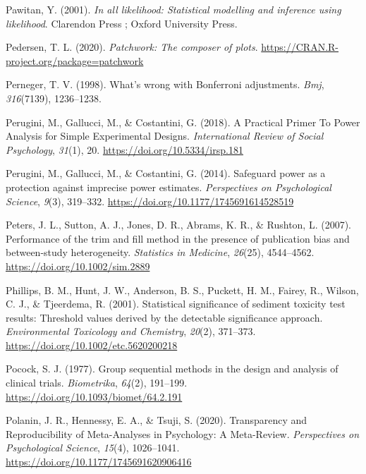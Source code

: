 \documentclass[
  oneside]{krantz}
\newlength{\cslhangindent}
\newlength{\cslentryspacingunit} %
\newenvironment{CSLReferences}[2] %
 {%
  \setlength{\parindent}{0pt}
  \ifodd #1
  \let\oldpar\par
  \def\par{\hangindent=\cslhangindent\oldpar}
  \fi
  \setlength{\parskip}{#2\cslentryspacingunit}
 }%
 {}
\begin{document}
\begin{CSLReferences}{1}{0}
\leavevmode{}%
Pawitan, Y. (2001). \emph{In all likelihood: Statistical modelling and
inference using likelihood}. {Clarendon Press ; Oxford University
Press}.

\leavevmode{}%
Pedersen, T. L. (2020). \emph{Patchwork: The composer of plots}.
\url{https://CRAN.R-project.org/package=patchwork}

\leavevmode{}%
Perneger, T. V. (1998). What's wrong with {Bonferroni} adjustments.
\emph{Bmj}, \emph{316}(7139), 1236--1238.

\leavevmode{}%
Perugini, M., Gallucci, M., \& Costantini, G. (2018). A {Practical
Primer To Power Analysis} for {Simple Experimental Designs}.
\emph{International Review of Social Psychology}, \emph{31}(1), 20.
\url{https://doi.org/10.5334/irsp.181}

\leavevmode{}%
Perugini, M., Gallucci, M., \& Costantini, G. (2014). Safeguard power as
a protection against imprecise power estimates. \emph{Perspectives on
Psychological Science}, \emph{9}(3), 319--332.
\url{https://doi.org/10.1177/1745691614528519}

\leavevmode{}%
Peters, J. L., Sutton, A. J., Jones, D. R., Abrams, K. R., \& Rushton,
L. (2007). Performance of the trim and fill method in the presence of
publication bias and between-study heterogeneity. \emph{Statistics in
Medicine}, \emph{26}(25), 4544--4562.
\url{https://doi.org/10.1002/sim.2889}

\leavevmode{}%
Phillips, B. M., Hunt, J. W., Anderson, B. S., Puckett, H. M., Fairey,
R., Wilson, C. J., \& Tjeerdema, R. (2001). Statistical significance of
sediment toxicity test results: {Threshold} values derived by the
detectable significance approach. \emph{Environmental Toxicology and
Chemistry}, \emph{20}(2), 371--373.
\url{https://doi.org/10.1002/etc.5620200218}

\leavevmode{}%
Pocock, S. J. (1977). Group sequential methods in the design and
analysis of clinical trials. \emph{Biometrika}, \emph{64}(2), 191--199.
\url{https://doi.org/10.1093/biomet/64.2.191}

\leavevmode{}%
Polanin, J. R., Hennessy, E. A., \& Tsuji, S. (2020). Transparency and
{Reproducibility} of {Meta-Analyses} in {Psychology}: {A Meta-Review}.
\emph{Perspectives on Psychological Science}, \emph{15}(4), 1026--1041.
\url{https://doi.org/10.1177/1745691620906416}


\end{CSLReferences}
\end{document}
